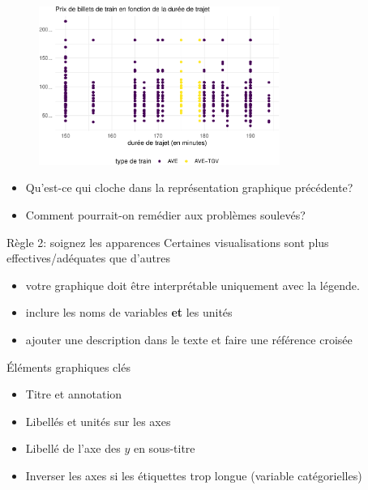 \documentclass[
  ignorenonframetext,
]{beamer}
\providecommand{\tightlist}{%
  \setlength{\itemsep}{0pt}\setlength{\parskip}{0pt}}\usepackage{longtable,booktabs,array}
\begin{document}
\begin{frame}
\begin{figure}

{\centering \includegraphics[width=0.7\textwidth,height=\textheight]{MATH60602-diapos1_files/figure-beamer/renfe_nuagepts_code-1.pdf}

}

\end{figure}

\begin{itemize}
\tightlist
\item
  Qu'est-ce qui cloche dans la représentation graphique précédente?
\item
  Comment pourrait-on remédier aux problèmes soulevés?
\end{itemize}
\end{frame}

\begin{frame}{Règle 2: soignez les apparences}
\protect\hypertarget{ruxe8gle-2-soignez-les-apparences}{}
Certaines visualisations sont plus effectives/adéquates que d'autres

\begin{itemize}
\tightlist
\item
  votre graphique doit être interprétable uniquement avec la légende.
\item
  inclure les noms de variables \textbf{et} les unités
\item
  ajouter une description dans le texte et faire une référence croisée
\end{itemize}
\end{frame}

\begin{frame}{Éléments graphiques clés}
\protect\hypertarget{uxe9luxe9ments-graphiques-cluxe9s}{}
\begin{itemize}
\tightlist
\item
  Titre et annotation
\item
  Libellés et unités sur les axes
\item
  Libellé de l'axe des \(y\) en sous-titre
\item
  Inverser les axes si les étiquettes trop longue (variable
  catégorielles)
\end{itemize}
\end{frame}
\end{document}
